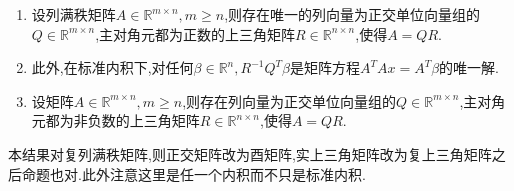 \documentclass[../../main.tex]{subfiles}%
\begin{document}
\begin{theorem}\label{theorem:施密特正交化对应的矩阵分解,QR分解}
\begin{enumerate}
\item 设列满秩矩阵\( A \in \mathbb{R}^{m \times n}, m \geqslant  n \),则存在唯一的列向量为正交单位向量组的\( Q \in \mathbb{R}^{m \times n} \),主对角元都为正数的上三角矩阵\( R \in \mathbb{R}^{n \times n} \),使得\( A = QR \).

\item 此外,在标准内积下,对任何\( \beta \in \mathbb{R}^n, R^{-1} Q^T \beta \)是矩阵方程\( A^T A x = A^T \beta \)的唯一解.

\item 设矩阵\( A \in \mathbb{R}^{m \times n}, m \geqslant  n \),则存在列向量为正交单位向量组的\( Q \in \mathbb{R}^{m \times n} \),主对角元都为非负数的上三角矩阵\( R \in \mathbb{R}^{n \times n} \),使得\( A = QR \).
\end{enumerate}
\end{theorem}
\begin{note}
本结果对复列满秩矩阵,则正交矩阵改为酉矩阵,实上三角矩阵改为复上三角矩阵之后命题也对.此外注意这里是任一个内积而不只是标准内积.
\end{note}
\end{document}
